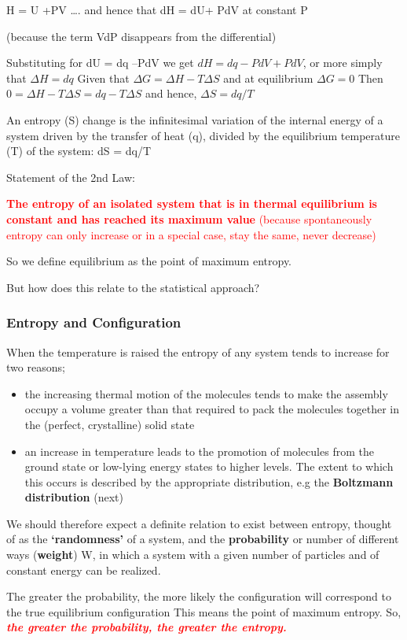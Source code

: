 \documentclass[a4paper,12pt,titlepage]{article}
\begin{document}
\begin{frame}[allowframebreaks=0.65]
\begin{center}
 H = U +PV …. and hence that dH = dU+ PdV at constant P 
\end{center}
(because the term VdP disappears from the differential)

\medskip Substituting for dU = dq –PdV we get\newline
\medskip \(dH = dq - PdV+ PdV\), or more simply that \(\Delta H = dq\)\newline
\medskip Given that \(\Delta G = \Delta H - T\Delta S\) and at equilibrium \(\Delta G=0\) \newline
\medskip Then \(0 =  \Delta H - T\Delta S  =  dq- T\Delta S\) and hence, \(\Delta S = dq/T\)

\medskip An entropy (S) change is the infinitesimal variation of the internal energy of a system driven by the transfer of heat (q), divided by the equilibrium temperature (T) of the system: dS = dq/T

\bigskip Statement of the 2nd Law:

\textcolor{red}{\textbf{The entropy of an isolated system that is in thermal equilibrium is constant and has reached its maximum value} (because spontaneously entropy can only increase or in a special case, stay the same, never decrease)}
 
\medskip So we define equilibrium as the point of maximum entropy.

\medskip But how does this relate to the statistical approach?
\end{frame}

\begin{frame}[allowframebreaks]
\frametitle{Entropy and Configuration}
When the temperature is raised the entropy of any system tends to increase for two reasons;  
\begin{itemize}
\item the increasing thermal motion of the molecules tends to make the assembly occupy a volume greater than that required to pack the molecules together in the (perfect, crystalline)  solid state

\item an increase in temperature leads to the promotion of molecules from the ground state or low-lying energy states to higher levels.  The extent to which this occurs is described by the appropriate distribution, e.g the \textbf{Boltzmann distribution} (next)
 \end{itemize}
 
We should therefore expect a definite relation to exist between entropy, thought of as the \textbf{‘randomness’} of a system, and the \textbf{probability} or number of different ways (\textbf{weight})  W,  in which a system with a given number of particles and of constant energy can be realized.
 
\medskip The greater the probability, the more likely the configuration will correspond to the true equilibrium configuration
This means the point of maximum entropy. So, \textcolor{red}{\textbf{\textsl{the greater the probability, the greater the entropy.}}}
\end{frame}
\end{document}
